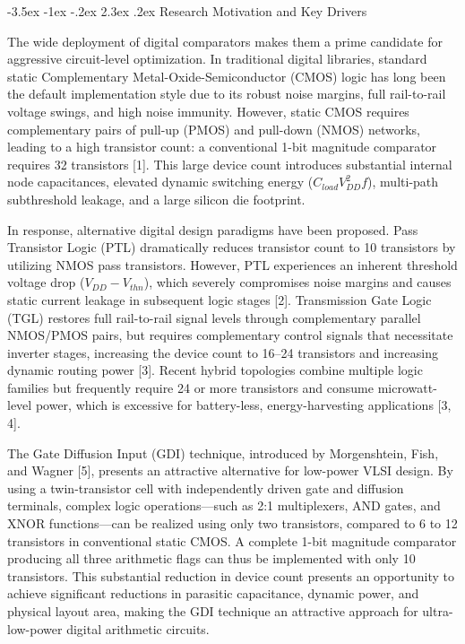 \documentclass[12pt,a4paper,oneside]{report}
\makeatletter
\renewcommand\section{\@startsection {section}{1}{\z@}%
                                   {-3.5ex \@plus -1ex \@minus -.2ex}%
                                   {2.3ex \@plus.2ex}%
                                   {\normalfont\normalsize\bfseries}}
\makeatother
\begin{document}
\section{Research Motivation and Key Drivers}

The wide deployment of digital comparators makes them a prime candidate for aggressive circuit-level optimization. In traditional digital libraries, standard static Complementary Metal-Oxide-Semiconductor (CMOS) logic has long been the default implementation style due to its robust noise margins, full rail-to-rail voltage swings, and high noise immunity. However, static CMOS requires complementary pairs of pull-up (PMOS) and pull-down (NMOS) networks, leading to a high transistor count: a conventional 1-bit magnitude comparator requires 32 transistors [1]. This large device count introduces substantial internal node capacitances, elevated dynamic switching energy ($C_{load} V_{DD}^2 f$), multi-path subthreshold leakage, and a large silicon die footprint.

In response, alternative digital design paradigms have been proposed. Pass Transistor Logic (PTL) dramatically reduces transistor count to 10 transistors by utilizing NMOS pass transistors. However, PTL experiences an inherent threshold voltage drop ($V_{DD} - V_{thn}$), which severely compromises noise margins and causes static current leakage in subsequent logic stages [2]. Transmission Gate Logic (TGL) restores full rail-to-rail signal levels through complementary parallel NMOS/PMOS pairs, but requires complementary control signals that necessitate inverter stages, increasing the device count to 16--24 transistors and increasing dynamic routing power [3]. Recent hybrid topologies combine multiple logic families but frequently require 24 or more transistors and consume microwatt-level power, which is excessive for battery-less, energy-harvesting applications [3, 4].

The Gate Diffusion Input (GDI) technique, introduced by Morgenshtein, Fish, and Wagner [5], presents an attractive alternative for low-power VLSI design. By using a twin-transistor cell with independently driven gate and diffusion terminals, complex logic operations—such as 2:1 multiplexers, AND gates, and XNOR functions—can be realized using only two transistors, compared to 6 to 12 transistors in conventional static CMOS. A complete 1-bit magnitude comparator producing all three arithmetic flags can thus be implemented with only 10 transistors. This substantial reduction in device count presents an opportunity to achieve significant reductions in parasitic capacitance, dynamic power, and physical layout area, making the GDI technique an attractive approach for ultra-low-power digital arithmetic circuits.
\end{document}
